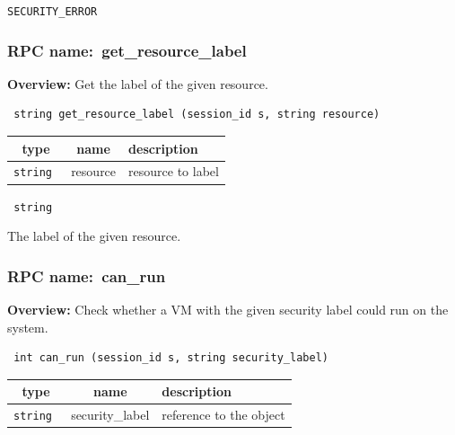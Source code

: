 \vspace{0.3cm}

 {\tt SECURITY\_ERROR}

\vspace{0.3cm}
\vspace{0.3cm}
\vspace{0.3cm}
\subsubsection{RPC name:~get\_resource\_label}

{\bf Overview:}
Get the label of the given resource.

\begin{verbatim} string get_resource_label (session_id s, string resource)\end{verbatim}




\vspace{0.3cm}
\begin{tabular}{|c|c|p{7cm}|}
 \hline
{\bf type} & {\bf name} & {\bf description} \\ \hline
{\tt string } & resource & resource to label \\ \hline

\end{tabular}

\vspace{0.3cm}

{\tt
string
}


The label of the given resource.
\vspace{0.3cm}
\vspace{0.3cm}
\vspace{0.3cm}
\subsubsection{RPC name:~can\_run}

{\bf Overview:}
Check whether a VM with the given security label could run on the system.

\begin{verbatim} int can_run (session_id s, string security_label)\end{verbatim}




\vspace{0.3cm}
\begin{tabular}{|c|c|p{7cm}|}
 \hline
{\bf type} & {\bf name} & {\bf description} \\ \hline
{\tt string } & security\_label & reference to the object \\ \hline

\end{tabular}

